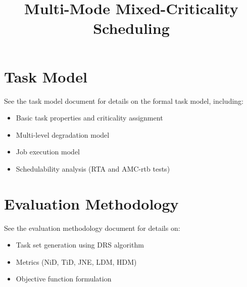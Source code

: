 \documentclass{article}
\title{Multi-Mode Mixed-Criticality Scheduling}
\author{}
\date{}
\begin{document}
\maketitle

\tableofcontents

\section{Task Model}

See the task model document for details on the formal task model, including:
\begin{itemize}
    \item Basic task properties and criticality assignment
    \item Multi-level degradation model
    \item Job execution model
    \item Schedulability analysis (RTA and AMC-rtb tests)
\end{itemize}



\section{Evaluation Methodology}

See the evaluation methodology document for details on:
\begin{itemize}
    \item Task set generation using DRS algorithm
    \item Metrics (NiD, TiD, JNE, LDM, HDM)
    \item Objective function formulation
\end{itemize}


\end{document}
